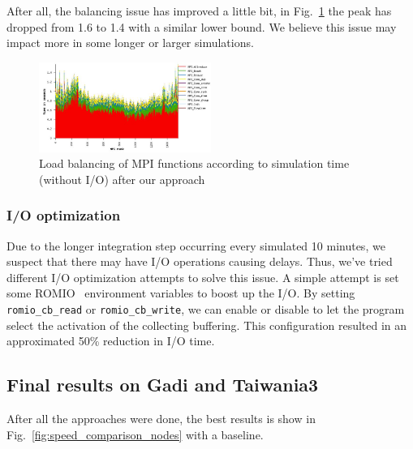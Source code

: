 After all, the balancing issue has improved a little bit, in Fig.~\ref{figure:profile-after} the peak has dropped from 1.6 to 1.4 with a similar lower bound. We believe this issue may impact more in some longer or larger simulations.

\begin{figure}[t]
    \centering
    \includegraphics[width=0.5\textwidth]{profile.JPG} 
    \caption{Load balancing of MPI functions according to simulation time (without I/O) after our approach}
    \label{figure:profile-after}
\end{figure}

\subsubsection{I/O optimization}
Due to the longer integration step occurring every simulated 10 minutes, we suspect that there may have I/O operations causing delays. Thus, we've tried different I/O optimization attempts to solve this issue. A simple attempt is set some ROMIO~\cite{ROMIO} environment variables to boost up the I/O. By setting \texttt{romio\_cb\_read} or \texttt{romio\_cb\_write}, we can enable or disable to let the program select the activation of the collecting buffering. This configuration resulted in an approximated 50\% reduction in I/O time.

\subsection{Final results on Gadi and Taiwania3}
After all the approaches were done, the best results is show in Fig.~\ref{fig:speed_comparison_nodes} with a baseline.


